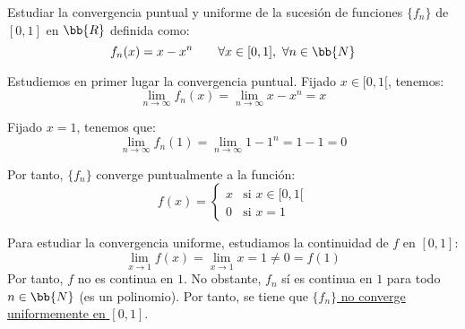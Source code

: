 \begin{ejercicio}
    Estudiar la convergencia puntual y uniforme de la sucesión de funciones $\{f_n\}$ de $[0,1]$ en $\bb{R}$ definida como:
    \begin{equation*}
        f_n(x) = x-x^n \qquad \forall x\in [0,1],~\forall n\in \bb{N}
    \end{equation*}

    Estudiemos en primer lugar la convergencia puntual. Fijado $x\in [0,1[$, tenemos:
    \begin{equation*}
        \lim_{n\to \infty} f_n(x) = \lim_{n\to \infty} x-x^n = x
    \end{equation*}

    Fijado $x=1$, tenemos que:
    \begin{equation*}
        \lim_{n\to \infty} f_n(1) = \lim_{n\to \infty} 1-1^n = 1-1=0
    \end{equation*}

    Por tanto, $\{f_n\}$ converge puntualmente a la función:
    \begin{equation*}
        f(x) = \begin{cases}
            x & \text{si } x\in [0,1[\\
            0 & \text{si } x=1
        \end{cases}
    \end{equation*}

    Para estudiar la convergencia uniforme, estudiamos la continuidad de $f$ en $[0,1]$:
    \begin{equation*}
        \lim_{x\to 1}f(x) = \lim_{x\to 1}x = 1 \neq 0 = f(1)
    \end{equation*}
    Por tanto, $f$ no es continua en $1$. No obstante, $f_n$ sí es continua en $1$ para todo $n\in \bb{N}$ (es un polinomio). Por tanto, se tiene que \ul{$\{f_n\}$ no converge uniformemente en $[0,1]$}.
\end{ejercicio}


